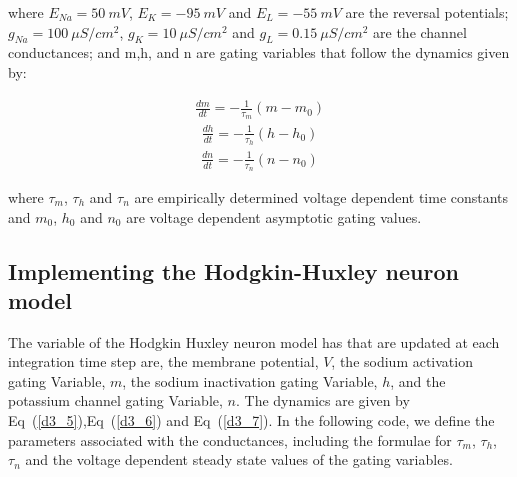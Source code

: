 \documentclass[10pt,letterpaper]{article}
\begin{document}
where $E_{Na}=50\ mV$, $E_K = -95\ mV$ and $E_L=-55\ mV$ are the reversal potentials; $g_{Na} = 100\ \mu S/cm^2$, $g_K = 10\ \mu S/cm^2$ and $g_L = 0.15\ \mu S/cm^2$ are the channel conductances; and m,h, and n are gating variables that follow the dynamics given by:

\begin{eqnarray}\label{d3_5}\frac{dm}{dt} = - \frac{1}{\tau_m}(m-m_0)\end{eqnarray}
\begin{eqnarray}\label{d3_6}\frac{dh}{dt} = - \frac{1}{\tau_h}(h-h_0)\end{eqnarray}
\begin{eqnarray}\label{d3_7}\frac{dn}{dt} = - \frac{1}{\tau_n}(n-n_0)\end{eqnarray}

where $\tau_m$, $\tau_h$ and $\tau_n$ are empirically determined voltage dependent time constants and $m_0$, $h_0$ and $n_0$ are voltage dependent asymptotic gating values.

\subsection*{Implementing the Hodgkin-Huxley neuron model}

The variable of the Hodgkin Huxley neuron model has that are updated at each integration time step are, the membrane potential, $V$, the sodium activation gating Variable, $m$, the sodium inactivation gating Variable, $h$, and the potassium channel gating Variable, $n$. The dynamics are given by Eq~(\ref{d3_5}),Eq~(\ref{d3_6}) and Eq~(\ref{d3_7}). In the following code, we define the parameters associated with the conductances, including the formulae for $\tau_{m}$, $\tau_{h}$, $\tau_{n}$ and the voltage dependent steady state values of the gating variables. 
\end{document}
